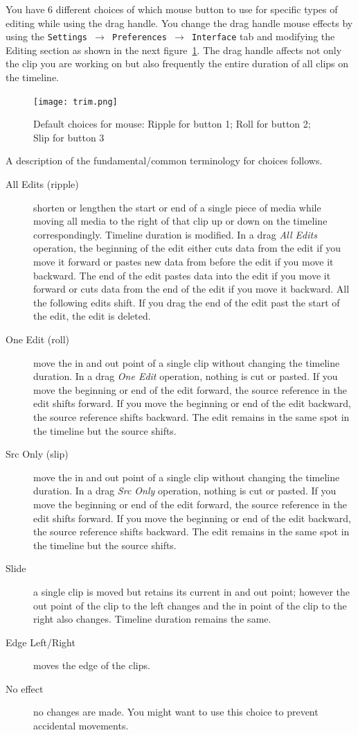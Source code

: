 You have 6 different choices of which mouse button to use for
specific types of editing while using the drag handle.  You change
the drag handle mouse effects by using the \texttt{Settings
	$\rightarrow$ Preferences  $\rightarrow$ Interface} tab and
modifying the Editing section as shown in the next
figure~\ref{fig:trim}. The drag handle affects not only the clip you
are working on but also frequently the entire duration of all clips
on the timeline.

\begin{figure}[htpb]
	\centering
	\texttt{[image: trim.png]}
	\caption{Default choices for mouse: Ripple for button 1; Roll
		for button 2; Slip for button 3}
	\label{fig:trim}
\end{figure}

A description of the fundamental/common terminology for choices
follows.

\begin{description}
	\item[All Edits (ripple)] shorten or lengthen the start or end
	of a single piece of media while moving all media to the right of
	that clip up or down on the timeline correspondingly.  Timeline
	duration is modified.  In a drag \textit{All Edits} operation, the
	beginning of the edit either cuts data from the edit if you move it
	forward or pastes new data from before the edit if you move it
	backward. The end of the edit pastes data into the edit if you move
	it forward or cuts data from the end of the edit if you move it
	backward. All the following edits shift. If you drag the end of the
	edit past the start of the edit, the edit is deleted.
	\item[One Edit (roll)] move the in and out point of a single
	clip without changing the timeline duration. In a drag \textit{One
		Edit} operation, nothing is cut or pasted. If you move the beginning
	or end of the edit forward, the source reference in the edit shifts
	forward. If you move the beginning or end of the edit backward, the
	source reference shifts backward. The edit remains in the same spot
	in the timeline but the source shifts.
	\item[Src Only (slip)] move the in and out point of a single
	clip without changing the timeline duration. In a drag \textit{Src
		Only} operation, nothing is cut or pasted. If you move the beginning
	or end of the edit forward, the source reference in the edit shifts
	forward. If you move the beginning or end of the edit backward, the
	source reference shifts backward. The edit remains in the same spot
	in the timeline but the source shifts.
	\item[Slide] a single clip is moved but retains its current in
	and out point; however the out point of the clip to the left changes
	and the in point of the clip to the right also changes.  Timeline
	duration remains the same.
	\item[Edge Left/Right] moves the edge of the clips.
	\item[No effect] no changes are made.  You might want to use
	this choice to prevent accidental movements.
\end{description}

